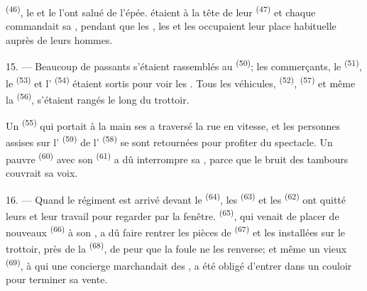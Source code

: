 \textsuperscript{(46)}, le
 et le  l'ont salué de l'épée.
 étaient à la tête de leur 
\textsuperscript{(47)} et chaque  commandait sa
, pendant que les , les
 et les  occupaient leur place
habituelle auprès de leurs hommes.

15. --- Beaucoup de passants s'étaient rassemblés au 
\textsuperscript{(50)}; les commerçants, le 
\textsuperscript{(51)}, le  \textsuperscript{(53)} et
l' \textsuperscript{(54)} étaient sortis pour voir les
. Tous les véhicules,  \textsuperscript{(52)},
 \textsuperscript{(57)} et même la  \textsuperscript{(56)}, s'étaient rangés le long du trottoir.

\VUsaut{3.0mm}

Un  \textsuperscript{(55)} qui portait à la
main ses  a traversé la rue en vitesse, et les
personnes assises sur l' \textsuperscript{(59)} de
l' \textsuperscript{(58)} se sont retournées pour profiter du
spectacle. Un pauvre  \textsuperscript{(60)} avec son
 \textsuperscript{(61)} a dû interrompre sa
, parce que le bruit des tambours couvrait sa voix.

16. --- Quand le régiment est arrivé devant le 
\textsuperscript{(64)}, les  \textsuperscript{(63)} et les
 \textsuperscript{(62)} ont quitté leurs  et leur travail pour regarder par la fenêtre. 
\textsuperscript{(65)}, qui venait de placer de nouveaux 
\textsuperscript{(66)} à son , a dû faire rentrer les pièces de
 \textsuperscript{(67)} et les  installées sur le
trottoir, près de la  \textsuperscript{(68)}, de peur que
la foule ne les renverse; et même un vieux 
\textsuperscript{(69)}, à qui une concierge marchandait des , a été
obligé d'entrer dans un couloir pour terminer sa vente.


